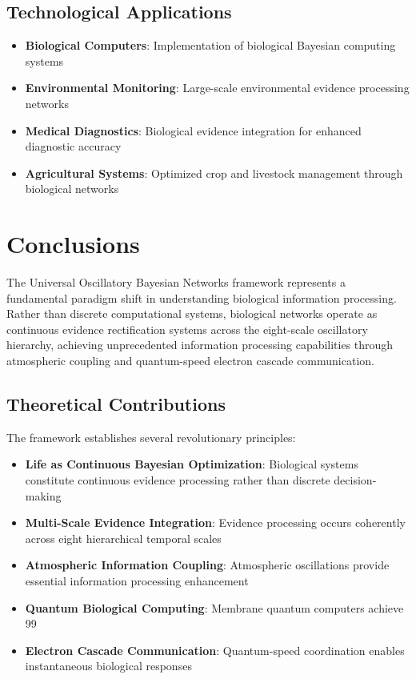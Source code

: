 \documentclass[12pt,a4paper]{article}
\begin{document}
\begin{table}[H]
\begin{table}[H]
\subsection{Technological Applications}

\begin{itemize}
\item \textbf{Biological Computers}: Implementation of biological Bayesian computing systems
\item \textbf{Environmental Monitoring}: Large-scale environmental evidence processing networks
\item \textbf{Medical Diagnostics}: Biological evidence integration for enhanced diagnostic accuracy
\item \textbf{Agricultural Systems}: Optimized crop and livestock management through biological networks
\end{itemize}

\section{Conclusions}

The Universal Oscillatory Bayesian Networks framework represents a fundamental paradigm shift in understanding biological information processing. Rather than discrete computational systems, biological networks operate as continuous evidence rectification systems across the eight-scale oscillatory hierarchy, achieving unprecedented information processing capabilities through atmospheric coupling and quantum-speed electron cascade communication.

\subsection{Theoretical Contributions}

The framework establishes several revolutionary principles:

\begin{itemize}
\item \textbf{Life as Continuous Bayesian Optimization}: Biological systems constitute continuous evidence processing rather than discrete decision-making
\item \textbf{Multi-Scale Evidence Integration}: Evidence processing occurs coherently across eight hierarchical temporal scales
\item \textbf{Atmospheric Information Coupling}: Atmospheric oscillations provide essential information processing enhancement
\item \textbf{Quantum Biological Computing}: Membrane quantum computers achieve 99%
\item \textbf{Electron Cascade Communication}: Quantum-speed coordination enables instantaneous biological responses
\end{itemize}


\end{table}
\end{table}
\end{document}
